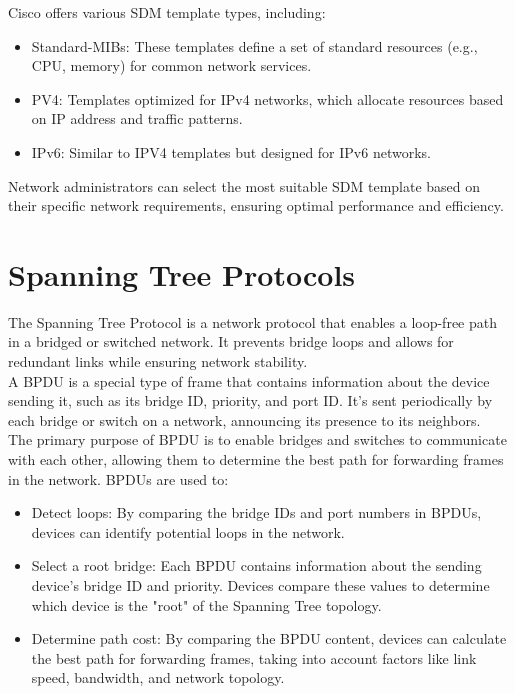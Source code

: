 \documentclass{article}
\begin{document}
Cisco offers various SDM template types, including:
	\begin{itemize}
		\item  Standard-MIBs: These templates define a set of standard resources (e.g., CPU, memory) for common network services.
		\item PV4: Templates optimized for IPv4 networks, which allocate resources based on IP address and traffic patterns. 
		\item IPv6: Similar to IPV4 templates but designed for IPv6 networks. 
	\end{itemize}

Network administrators can select the most suitable SDM template based on their specific network requirements, ensuring optimal performance and efficiency.\\

\section*{Spanning Tree Protocols}
The Spanning Tree Protocol is a network protocol that enables a loop-free path in a bridged or switched network. It prevents bridge loops and allows for redundant links while ensuring network stability.\\

A BPDU is a special type of frame that contains information about the device sending it, such as its bridge ID, priority, and port ID. It's sent periodically by each bridge or switch on a network, announcing its presence to its neighbors.\\

The primary purpose of BPDU is to enable bridges and switches to communicate with each other, allowing them to determine the best path for forwarding frames in the network. BPDUs are used to:
	\begin{itemize}
		\item Detect loops: By comparing the bridge IDs and port numbers in BPDUs, devices can identify potential loops in the network.
		\item Select a root bridge: Each BPDU contains information about the sending device's bridge ID and priority. Devices compare these values to determine which device is the "root" of the Spanning Tree topology.
		\item Determine path cost: By comparing the BPDU content, devices can calculate the best path for forwarding frames, taking into account factors like link speed, bandwidth, and network topology.
	\end{itemize}
\end{document}
